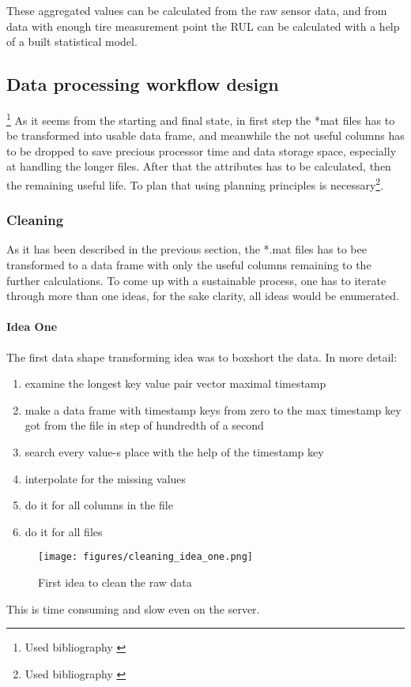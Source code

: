 These aggregated values can be calculated from the raw sensor data, and from data with enough tire measurement point the RUL can be calculated with a help of a built statistical model.

\subsection{Data processing workflow design}\footnote{Used bibliography \cite{CSDISTILLED}\cite{DATACAMP}\cite{LeanThinking}}
As it seems from the starting and final state, in first step the *mat files has to be transformed into usable data frame, and meanwhile the not useful columns has to be dropped to save precious processor time and data storage space, especially at handling the longer files. After that the attributes has to be calculated, then the remaining useful life.
To plan that using planning principles is necessary\footnote{Used bibliography \cite{CSDISTILLED}\cite{DATACAMP}\cite{LeanThinking}}.
	\subsubsection{Cleaning}
		\noindent
	As it has been described in the previous section, the *.mat files has to bee transformed to a data frame with only the useful columns remaining to the further calculations.
		\noindent
	To come up with a sustainable process, one has to iterate through more than one ideas, for the sake clarity, all ideas would be enumerated.
		\paragraph{Idea One}
			The first data shape transforming idea was to boxshort the data. In more detail:
\begin{enumerate}
	\item{examine the longest key value pair vector maximal timestamp} 
	\item{make a data frame with timestamp keys from zero to the max timestamp key got from the file in step of hundredth of a second}
	\item{search every value-s place with the help of the timestamp key}
	\item{interpolate for the missing values}
	\item{do it for all columns in the file}
	\item{do it for all files}
\end{enumerate}
			\begin{figure}[!ht]
			\centering
			\texttt{[image: figures/cleaning\_idea\_one.png]}
			\caption{First idea to clean the raw data} 
			\end{figure}
		\noindent
This is time consuming and slow even on the server.
